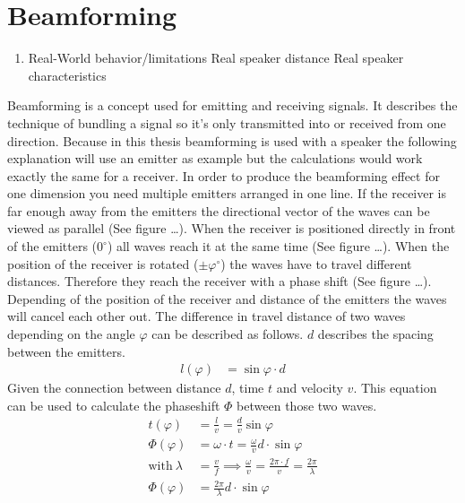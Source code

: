 \section{Beamforming}\label{sec:theory:beam}

\begin{enumerate}
  \item Real-World behavior/limitations
  \subitem Real speaker distance
  \subitem Real speaker characteristics
\end{enumerate}

Beamforming is a concept used for emitting and receiving signals. It describes the technique of bundling a signal so it's only transmitted into or received from one direction. Because in this thesis beamforming is used with a speaker the following explanation will use an emitter as example but the calculations would work exactly the same for a receiver.\p
%
In order to produce the beamforming effect for one dimension you need multiple emitters arranged in one line.
If the receiver is far enough away from the emitters the directional vector of the waves can be viewed as parallel (See figure \dots). When the receiver is positioned directly in front of the emitters (\(0^\circ\)) all waves reach it at the same time (See figure \dots).
When the position of the receiver is rotated (\(\pm \varphi^\circ\)) the waves have to travel different distances. Therefore they reach the receiver with a phase shift (See figure \dots). Depending of the position of the receiver and distance of the emitters the waves will cancel each other out.\p
%
The difference in travel distance of two waves depending on the angle \(\varphi\) can be described as follows. \(d\) describes the spacing between the emitters.
%
\begin{align}
  l(\varphi) &= \sin \varphi \cdot d
\end{align}
%
Given the connection between distance $d$, time $t$ and velocity $v$. This equation can be used to calculate the phaseshift $\Phi$ between those two waves.
%
\begin{align}
  t(\varphi)     &= \frac{l}{v} = \frac{d}{v} \sin \varphi \\[1em]
  \Phi(\varphi)  &= \omega \cdot t = \frac{\omega}{v} d \cdot \sin \varphi \\[1em]
  \mathrm{with~} \lambda &= \frac{v}{f} \implies \frac{\omega}{v} = \frac{2\pi \cdot f}{v} = \frac{2\pi}{\lambda} \\[1em]
  \Phi(\varphi)  &= \frac{2\pi}{\lambda} d \cdot \sin \varphi \label{eq:theory:beam:single_phaseshift}
\end{align}
